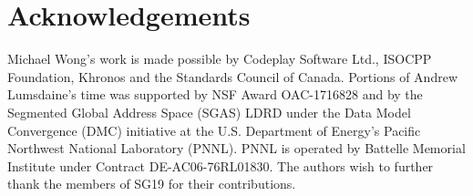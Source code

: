
\section{Acknowledgements}

Michael Wong's work is made possible by Codeplay Software Ltd., ISOCPP Foundation, Khronos and the Standards Council of Canada.  
%
Portions of Andrew Lumsdaine's time was supported by NSF Award OAC-1716828 and by the
Segmented Global Address Space (SGAS) LDRD under the Data Model Convergence (DMC)
initiative at the U.S. Department of Energy's Pacific Northwest National Laboratory
(PNNL). PNNL is operated by Battelle Memorial Institute under Contract
DE-AC06-76RL01830.
%
The authors wish to further thank the members of SG19 for their contributions.


